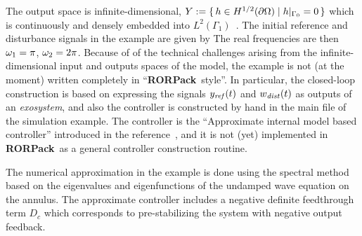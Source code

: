 \documentclass[11pt, a4paper]{amsart}
\theoremstyle{definition}
\numberwithin{equation}{section}
\newcommand{\yref}{y_{\mbox{\scriptsize\textit{ref}}}}
\newcommand{\wdist}{w_{\mbox{\scriptsize\textit{dist}}}}
\newcommand{\RORname}{\textbf{RORPack}}
\begin{document}
  The output space is infinite-dimensional,  $Y :=  \{\,h\in H^{1/2}(\partial\Omega)\mid h\vert_{\Gamma_0}=0\,\}$ which is continuously and densely embedded into $L^2(\Gamma_1)$~. 
The initial reference and disturbance signals in the example are given by
  The real frequencies are then $\omega_1=\pi$, $ \omega_2=2\pi$.
Because of of the technical challenges arising from the infinite-dimensional input and outputs spaces of the model, the example is not (at the moment) written completely in ``\RORname\ style''. In particular, the closed-loop construction is based on expressing the signals $\yref(t)$ and $\wdist(t)$ as outputs of an \emph{exosystem}, and also the controller is constructed by hand in the main file of the simulation example. The controller is the ``Approximate internal model based controller'' introduced in the reference~\cite{HumKur19}, and it is not (yet) implemented in \RORname\ as a general controller construction routine.

  The numerical approximation in the example is done using the spectral method based on the eigenvalues and eigenfunctions of the undamped wave equation on the annulus. The approximate controller includes a negative definite feedthrough term $D_c$ which corresponds to pre-stabilizing the system with negative output feedback. 
\end{document}
